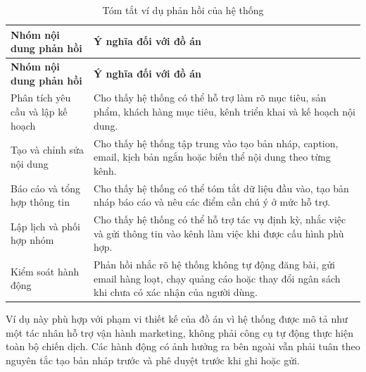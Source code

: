 \documentclass[a4paper]{article}
\renewcommand{\arraystretch}{1.25}
\begin{document}
\renewcommand{\arraystretch}{1.25}
\begin{longtable}{L{0.30\textwidth}L{0.60\textwidth}}
\caption{Tóm tắt ví dụ phản hồi của hệ thống}\\
\toprule
\textbf{Nhóm nội dung phản hồi} & \textbf{Ý nghĩa đối với đồ án}\\
\midrule
\endfirsthead
\toprule
\textbf{Nhóm nội dung phản hồi} & \textbf{Ý nghĩa đối với đồ án}\\
\midrule
\endhead
Phân tích yêu cầu và lập kế hoạch & Cho thấy hệ thống có thể hỗ trợ làm rõ mục tiêu, sản phẩm, khách hàng mục tiêu, kênh triển khai và kế hoạch nội dung.\\
Tạo và chỉnh sửa nội dung & Cho thấy hệ thống tập trung vào tạo bản nháp, caption, email, kịch bản ngắn hoặc biến thể nội dung theo từng kênh.\\
Báo cáo và tổng hợp thông tin & Cho thấy hệ thống có thể tóm tắt dữ liệu đầu vào, tạo bản nháp báo cáo và nêu các điểm cần chú ý ở mức hỗ trợ.\\
Lập lịch và phối hợp nhóm & Cho thấy hệ thống có thể hỗ trợ tác vụ định kỳ, nhắc việc và gửi thông tin vào kênh làm việc khi được cấu hình phù hợp.\\
Kiểm soát hành động & Phản hồi nhắc rõ hệ thống không tự động đăng bài, gửi email hàng loạt, chạy quảng cáo hoặc thay đổi ngân sách khi chưa có xác nhận của người dùng.\\
\bottomrule
\end{longtable}
\renewcommand{\arraystretch}{1}

Ví dụ này phù hợp với phạm vi thiết kế của đồ án vì hệ thống được mô tả như một tác nhân hỗ trợ vận hành marketing, không phải công cụ tự động thực hiện toàn bộ chiến dịch. Các hành động có ảnh hưởng ra bên ngoài vẫn phải tuân theo nguyên tắc tạo bản nháp trước và phê duyệt trước khi ghi hoặc gửi.
\end{document}
